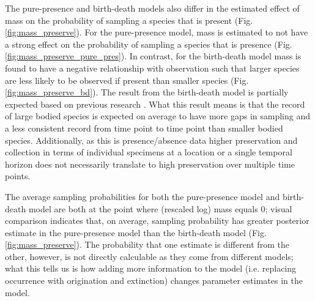 \documentclass[12pt,letterpaper]{article}
\begin{document}
The pure-presence and birth-death models also differ in the estimated effect of mass on the probability of sampling a species that is present (Fig. \ref{fig:mass_preserve}). For the pure-presence model, mass is estimated to not have a strong effect on the probability of sampling a species that is presence (Fig. \ref{fig:mass_preserve_pure_pres}). In contrast, for the birth-death model mass is found to have a negative relationship with observation such that larger species are less likely to be observed if present than smaller species (Fig. \ref{fig:mass_preserve_bd}). The result from the birth-death model is partially expected based on previous research \citep{Damuth1982}. What this result means is that the record of large bodied species is expected on average to have more gaps in sampling and a less consistent record from time point to time point than smaller bodied species. Additionally, as this is presence/absence data higher preservation and collection in terms of individual specimens at a location or a single temporal horizon does not necessarily translate to high preservation over multiple time points.

The average sampling probabilities for both the pure-presence model and birth-death model are both at the point where (rescaled log) mass equals 0; visual comparison indicates that, on average, sampling probability has greater posterior estimate in the pure-presence model than the birth-death model (Fig.\ref{fig:mass_preserve}). The probability that one estimate is different from the other, however, is not directly calculable as they come from different models; what this tells us is how adding more information to the model (i.e. replacing occurrence with origination and extinction) changes parameter estimates in the model.
\end{document}
